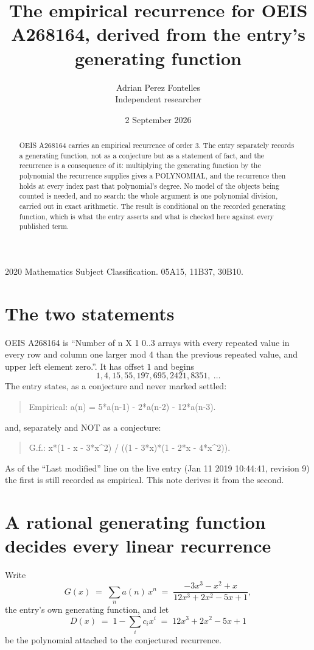\documentclass[11pt,a4paper]{article}
\title{The empirical recurrence for OEIS A268164, derived from the entry's generating function}
\author{Adrian Perez Fontelles\\ \small Independent researcher}
\date{2 September 2026}
\theoremstyle{plain}
\theoremstyle{definition}
\begin{document}
\maketitle

\begin{abstract}
OEIS A268164 carries an empirical recurrence of order $3$. The entry separately records a
generating function, not as a conjecture but as a statement of fact, and the recurrence is a
consequence of it: multiplying the generating function by the polynomial the recurrence
supplies gives a POLYNOMIAL, and the recurrence then holds at every index past that
polynomial's degree. No model of the objects being counted is needed, and no search: the
whole argument is one polynomial division, carried out in exact arithmetic. The result is
conditional on the recorded generating function, which is what the entry asserts and what is
checked here against every published term.
\end{abstract}

\noindent\small 2020 Mathematics Subject Classification. 05A15, 11B37, 30B10.\normalsize

\section{The two statements}

OEIS A268164 is ``Number of n X 1 0..3 arrays with every repeated value in every row and column one larger mod 4 than the previous repeated value, and upper left element zero.''. It has offset $1$ and begins
\[
1, 4, 15, 55, 197, 695, 2421, 8351,\ \dots
\]
The entry states, as a conjecture and never marked settled:
\begin{quote}
Empirical: a(n) = 5*a(n-1) - 2*a(n-2) - 12*a(n-3).
\end{quote}
and, separately and NOT as a conjecture:
\begin{quote}
G.f.: x*(1 - x - 3*x\^{}2) / ((1 - 3*x)*(1 - 2*x - 4*x\^{}2)).
\end{quote}
As of the ``Last modified'' line on the live entry (Jan 11 2019 10:44:41, revision 9) the first is still
recorded as empirical. This note derives it from the second.

\section{A rational generating function decides every linear recurrence}

Write
\[
G(x)\;=\;\sum_{n}a(n)\,x^{n}\;=\;\frac{- 3 x^{3} - x^{2} + x}{12 x^{3} + 2 x^{2} - 5 x + 1},
\]
the entry's own generating function, and let
\[
D(x)\;=\;1-\sum_i c_i x^{i}\;=\;12 x^{3} + 2 x^{2} - 5 x + 1
\]
be the polynomial attached to the conjectured recurrence.
\end{document}
